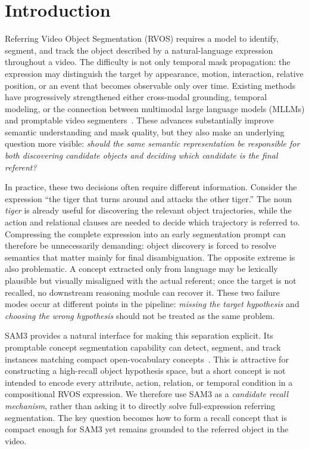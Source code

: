 \section{Introduction}

Referring Video Object Segmentation (RVOS) requires a model to identify, segment, and track the object described by a natural-language expression throughout a video. The difficulty is not only temporal mask propagation: the expression may distinguish the target by appearance, motion, interaction, relative position, or an event that becomes observable only over time. Existing methods have progressively strengthened either cross-modal grounding, temporal modeling, or the connection between multimodal large language models (MLLMs) and promptable video segmenters~\cite{wu2023onlinerefer,liang2025referdino,cuttano2024samwise,yuan2025sa2va,lin2025glus}. These advances substantially improve semantic understanding and mask quality, but they also make an underlying question more visible: \emph{should the same semantic representation be responsible for both discovering candidate objects and deciding which candidate is the final referent?}

In practice, these two decisions often require different information. Consider the expression ``the tiger that turns around and attacks the other tiger.'' The noun \emph{tiger} is already useful for discovering the relevant object trajectories, while the action and relational clauses are needed to decide which trajectory is referred to. Compressing the complete expression into an early segmentation prompt can therefore be unnecessarily demanding: object discovery is forced to resolve semantics that matter mainly for final disambiguation. The opposite extreme is also problematic. A concept extracted only from language may be lexically plausible but visually misaligned with the actual referent; once the target is not recalled, no downstream reasoning module can recover it. These two failure modes occur at different points in the pipeline: \emph{missing the target hypothesis} and \emph{choosing the wrong hypothesis} should not be treated as the same problem.

SAM3 provides a natural interface for making this separation explicit. Its promptable concept segmentation capability can detect, segment, and track instances matching compact open-vocabulary concepts~\cite{carion2025sam3}. This is attractive for constructing a high-recall object hypothesis space, but a short concept is not intended to encode every attribute, action, relation, or temporal condition in a compositional RVOS expression. We therefore use SAM3 as a \emph{candidate recall mechanism}, rather than asking it to directly solve full-expression referring segmentation. The key question becomes how to form a recall concept that is compact enough for SAM3 yet remains grounded to the referred object in the video.

